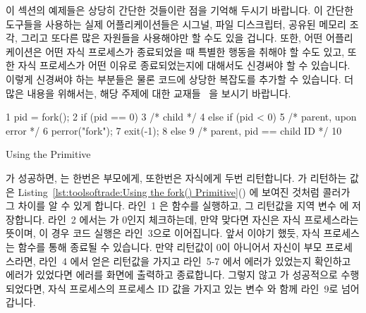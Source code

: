 이 섹션의 예제들은 상당히 간단한 것들이란 점을 기억해 두시기 바랍니다.
이 간단한 도구들을 사용하는 실제 어플리케이션들은 시그널, 파일 디스크립터,
공유된 메모리 조각, 그리고 또다른 많은 자원들을 사용해야만 할 수도 있을 겁니다.
또한, 어떤 어플리케이션은 어떤 자식 프로세스가 종료되었을 때 특별한 행동을
취해야 할 수도 있고, 또한 자식 프로세스가 어떤 이유로 종료되었는지에 대해서도
신경써야 할 수 있습니다.
이렇게 신경써야 하는 부분들은 물론 코드에 상당한 복잡도를 추가할 수 있습니다.
더 많은 내용을 위해서는, 해당 주제에 대한
교재들~\cite{WRichardStevens1992,StewartWeiss2013UNIX} 을 보시기 바랍니다.

\begin{listing}[tbp]
{ \scriptsize
\begin{verbbox}
  1 pid = fork();
  2 if (pid == 0) {
  3   /* child */
  4 } else if (pid < 0) {
  5   /* parent, upon error */
  6   perror("fork");
  7   exit(-1);
  8 } else {
  9   /* parent, pid == child ID */
 10 }
\end{verbbox}
}
\centering
\theverbbox
\caption{Using the  Primitive}
\label{lst:toolsoftrade:Using the fork() Primitive}
\end{listing}

 가 성공하면, 는 한번은 부모에게, 또한번은 자식에게 두번
리턴합니다.
 가 리턴하는 값은
Listing~\ref{lst:toolsoftrade:Using the fork() Primitive}() 에
보여진 것처럼 콜러가 그 차이를 알 수 있게 합니다.
라인~1 은  함수를 실행하고, 그 리턴값을 지역 변수  에
저장합니다.
라인~2 에서는  가 0인지 체크하는데, 만약 맞다면 자신은 자식
프로세스라는 뜻이며, 이 경우 코드 실행은 라인~3으로 이어집니다.
앞서 이야기 했듯, 자식 프로세스는  함수를 통해 종료될 수 있습니다.
만약  리턴값이 0이 아니어서 자신이 부모 프로세스라면, 라인~4 에서
얻은  리턴값을 가지고 라인~5-7 에서 에러가 있었는지 확인하고 에러가
있었다면 에러를 화면에 출력하고 종료합니다.
그렇지 않고  가 성공적으로 수행되었다면, 자식 프로세스의 프로세스 ID
값을 가지고 있는 변수  와 함께 라인~9로 넘어갑니다.

